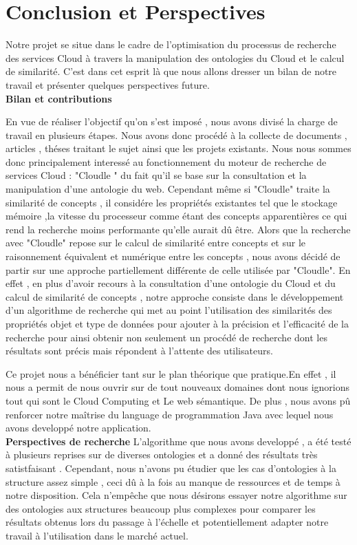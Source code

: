 \chapter*{Conclusion et Perspectives}

Notre projet se situe dans le cadre de l'optimisation du processus de recherche des services Cloud à travers la manipulation des ontologies du Cloud et le calcul de similarité.
C'est dans cet esprit là que nous allons dresser un bilan de notre travail et présenter quelques perspectives future.\\

\textbf{Bilan et contributions}

En vue de réaliser l'objectif qu'on s'est imposé , nous avons divisé la charge de travail en plusieurs étapes.
Nous avons donc procédé à la collecte de documents , articles , théses traitant le sujet ainsi que les projets existants.
Nous nous sommes donc principalement interessé au fonctionnement du moteur de recherche de services Cloud : "Cloudle " du fait qu'il se base sur la consultation et la manipulation d'une antologie du web.
Cependant même si "Cloudle" traite la similarité de concepts , il considére les propriétés existantes tel que le stockage mémoire ,la vitesse du processeur comme étant des concepts apparentières ce qui rend la recherche moins performante qu'elle aurait dû être.
Alors que la recherche avec "Cloudle" repose sur le calcul de similarité entre concepts et sur le raisonnement équivalent et numérique entre les concepts , nous avons décidé de partir sur une approche partiellement différente de celle utilisée par "Cloudle".
En effet , en plus d'avoir recours à la consultation d'une ontologie du Cloud et du calcul de similarité de concepts , notre approche consiste dans le développement d'un algorithme de recherche qui met au point l'utilisation des similarités des propriétés objet et type de données pour ajouter à la précision et l'efficacité de la recherche pour ainsi obtenir non seulement un procédé de recherche dont les résultats sont précis mais répondent à l'attente des utilisateurs.

Ce projet nous a bénéficier tant sur le plan théorique que pratique.En effet , il nous a permit de nous ouvrir sur de tout nouveaux domaines dont nous ignorions tout qui sont le Cloud Computing et Le web sémantique.
De plus , nous avons pû renforcer notre maîtrise du language de programmation Java avec lequel nous avons developpé notre application.\\

\textbf{Perspectives de recherche}
L'algorithme que nous avons developpé , a été testé à plusieurs reprises sur de diverses ontologies et a donné des résultats très satistfaisant .
Cependant, nous n'avons pu étudier que les cas d'ontologies à la structure assez simple , ceci dû à la fois au manque de ressources et de temps à notre disposition.
Cela n'empêche que nous désirons essayer notre algorithme sur des ontologies aux structures beaucoup plus complexes pour comparer les résultats obtenus lors du passage à l'échelle et potentiellement adapter notre travail à l'utilisation dans le marché actuel. 